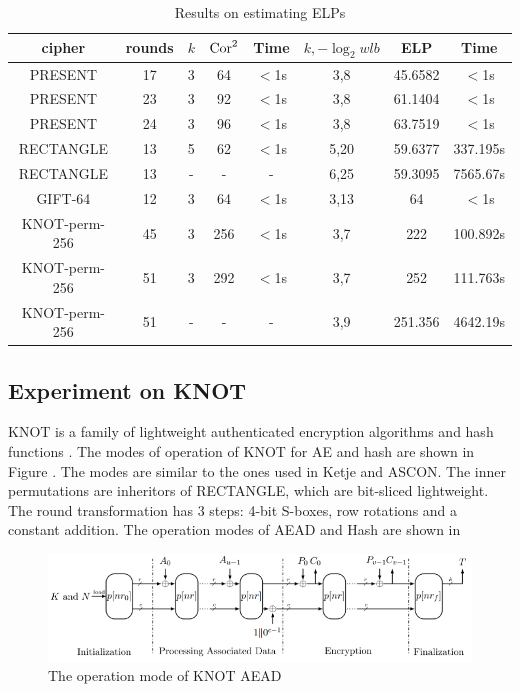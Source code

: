 \begin{table}
	\caption{Results on estimating ELPs}\label{tab:ELP}
	\centering
	\begin{tabular}{|c|c|c|c|c|c|c|c|}
		\hline
		cipher & rounds & $k$ & $\text{Cor}^2$ & Time & $k,-\log_2wlb$ & ELP & Time \\
		\hline
		PRESENT & 17 & 3 & 64 & $<$1s & 3,8 & 45.6582 & $<$1s\\
		\hline 
		PRESENT & 23 & 3 & 92 & $<$1s & 3,8 & 61.1404 & $<$1s\\
		\hline 
		PRESENT & 24 & 3 & 96 & $<$1s & 3,8 & 63.7519 & $<$1s\\
		\hline 
		RECTANGLE & 13 & 5 & 62 & $<$1s & 5,20 & 59.6377 & 337.195s \\
		\hline
		RECTANGLE & 13 & - & - & - & 6,25 & 59.3095 & 7565.67s \\
		\hline
		GIFT-64 & 12 & 3 & 64 & $<$1s& 3,13 & 64 & $<$1s \\
		\hline
		KNOT-perm-256 & 45 & 3 & 256 & $<$1s & 3,7 & 222 & 100.892s\\
		KNOT-perm-256 & 51 & 3 & 292 & $<$1s & 3,7 & 252 & 111.763s\\
		KNOT-perm-256 & 51 & - & - & - & 3,9 & 251.356 & 4642.19s\\
		\hline
	\end{tabular}
\end{table}

\subsection{Experiment on KNOT}

KNOT is a family of lightweight authenticated encryption algorithms and hash functions \cite{ZDY19}. The modes of operation of KNOT for AE and hash are shown in Figure . The modes are similar to the ones used in Ketje and ASCON. The inner permutations are inheritors of RECTANGLE, which are bit-sliced lightweight. The round transformation has 3 steps: 4-bit S-boxes, row rotations and a constant addition. The operation modes of AEAD and Hash are shown in 

\begin{figure}
	\centering
	\includegraphics[width=1\textwidth]{fig/mode_aead.PNG}
	\caption{The operation mode of KNOT AEAD} \label{fig:mode_aead}
\end{figure}

